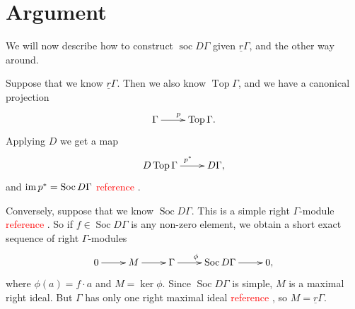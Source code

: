 \documentclass[12pt]{amsart}
\begin{document}
\section{Argument}
We will now describe how to construct \( \operatorname{soc}D \Gamma \) given \( \underline{r} \Gamma \), and the other way around.

Suppose that we know \( \underline{r}\Gamma \).
Then we also know \( \operatorname{Top} \Gamma \), and we have a canonical projection
\[
\xymatrix{
	\Gamma \ar[r]^p & \operatorname{Top} \Gamma .
}
\]
Applying \( D \) we get a map
\[
\xymatrix{
	D \operatorname{Top} \Gamma \ar[r]^{p^*} & D \Gamma ,
}
\]
and \( \operatorname{im} p^* = \operatorname{Soc} D \Gamma \) \textcolor{red}{reference} .

Conversely, suppose that we know \( \operatorname{Soc} D \Gamma \).
This is a simple right \( \Gamma \)-module \textcolor{red}{reference} .
So if \( f \in \operatorname{Soc} D \Gamma \) is any non-zero element, we obtain a short exact sequence of right \( \Gamma \)-modules
\[
\xymatrix{
	0 \ar[r] & M \ar[r] & \Gamma \ar[r]^{\phi} & \operatorname{Soc} D \Gamma \ar[r] & 0 ,
}
\]
where \( \phi (a) = f \cdot a \) and \( M = \ker \phi \).
Since \( \operatorname{Soc} D \Gamma \) is simple, \( M \) is a maximal right ideal.
But \( \Gamma \) has only one right maximal ideal \textcolor{red}{reference} , so \( M = \underline{r} \Gamma \).
\end{document}
